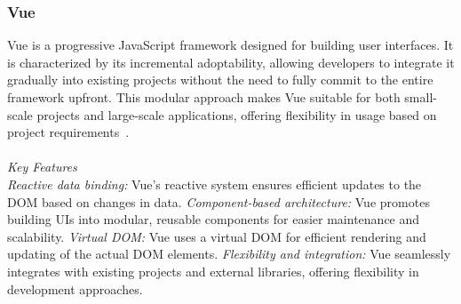 \documentclass[conference]{IEEEtran}
\begin{document}
\subsubsection{Vue}

Vue is a progressive JavaScript framework designed for building user interfaces. It is characterized by its incremental adoptability, allowing developers to integrate it gradually into existing projects without the need to fully commit to the entire framework upfront. This modular approach makes Vue suitable for both small-scale projects and large-scale applications, offering flexibility in usage based on project requirements~\cite{vuejs2024}.
\\\\
\textit{Key Features}\\
\textit{Reactive data binding:} Vue's reactive system ensures efficient updates to the DOM based on changes in data.
\newline\textit{Component-based architecture:} Vue promotes building UIs into modular, reusable components for easier maintenance and scalability.
\newline\textit{Virtual DOM:} Vue uses a virtual DOM for efficient rendering and updating of the actual DOM elements.
\newline\textit{Flexibility and integration:} Vue seamlessly integrates with existing projects and external libraries, offering flexibility in development approaches.
\newline



\end{document}
